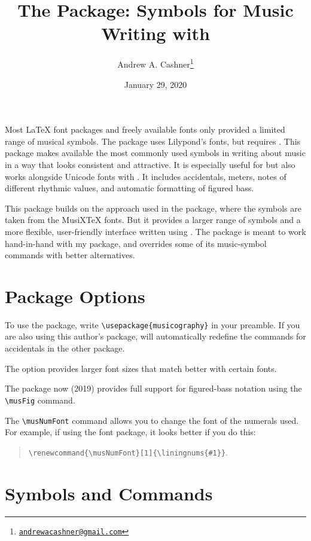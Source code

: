 \documentclass{article}
\title{The \code{musicography} Package: Symbols for Music Writing with
\code{pdflatex}}
\author{Andrew A. Cashner\thanks{%
    \href{mailto:andrewacashner@gmail.com}
    {\nolinkurl{andrewacashner@gmail.com}}%
    }%
}
\date{January 29, 2020}
\begin{document}
\maketitle

Most \LaTeX{} font packages and freely available fonts only provided a limited
range of musical symbols. 
The  package uses Lilypond's fonts, but requires
. 
This package makes available the most commonly used symbols in writing about
music in a way that looks consistent and attractive.
It is especially useful for  but also works alongside Unicode
fonts with .
It includes accidentals, meters, notes of different rhythmic values, and
automatic formatting of figured bass.

This package builds on the approach used in the  package, where
the symbols are taken from the MusiXTeX fonts.
But it provides a larger range of symbols and a more flexible, user-friendly
interface written using .
The package is meant to work hand-in-hand with my 
package, and overrides some of its music-symbol commands with better
alternatives.

\tableofcontents

\section{Package Options}

To use the package, write \verb|\usepackage{musicography}| in your preamble.
If you are also using this author's  package, 
 will automatically redefine the commands for accidentals in
the other package.

The  option provides larger font sizes that match better with
certain fonts.

The package now (2019) provides full support for figured-bass notation using the
\verb|\musFig| command.

The \verb|\musNumFont| command allows you to change the font of the numerals
used.
For example, if using the  font package, it looks better if you
do this: 
\begin{quote}
    \verb|\renewcommand{\musNumFont}[1]{\liningnums{#1}}|.
\end{quote}


\section{Symbols and Commands}
\end{document}
